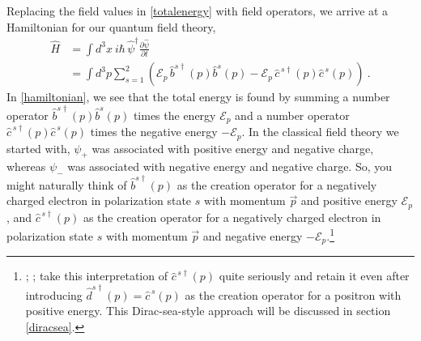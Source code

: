 \documentclass[12pt,secnumarabic,amsmath,amssymb,balancelastpage,nofootinbib]{article}
\begin{document}
Replacing the field values in \eqref{totalenergy} with field operators, we arrive at a Hamiltonian for our quantum field theory,
\begin{align}
\widehat{H}&=\int{d^3 x \ i \hbar \, \widehat{\psi}^\dagger\frac{\partial \widehat{\psi}}{\partial t}}
\nonumber
\\
&=\int{d^3 p \sum_{s=1}^2  \left(\mathcal{E}_p\,\widehat{b}^{s\dagger}(p)\widehat{b}^s(p)-\mathcal{E}_p\,\widehat{c}^{\,s\dagger}(p)\widehat{c}^{\,s}(p)\right)}
\ .
\label{hamiltonian}
\end{align}
In \eqref{hamiltonian}, we see that the total energy is found by summing a number operator $\widehat{b}^{s\dagger}(p)\widehat{b}^s(p)$ times the energy $\mathcal{E}_p$ and a number operator $\widehat{c}^{\,s\dagger}(p)\widehat{c}^{\,s}(p)$ times the negative energy $-\mathcal{E}_p$.  In the classical field theory we started with, $\psi_+$ was associated with positive energy and negative charge, whereas $\psi_-$ was associated with negative energy and negative charge.  So, you might naturally think of $\widehat{b}^{s\dagger}(p)$ as the creation operator for a negatively charged electron in polarization state $s$ with momentum $\vec{p}$ and positive energy $\mathcal{E}_p$, and $\widehat{c}^{\,s\dagger}(p)$ as the creation operator for a negatively charged electron in polarization state $s$ with momentum $\vec{p}$ and negative energy $-\mathcal{E}_p$.\footnote{\citet[sec.\ 8a]{schweberQFT}; \citet[sec.\ 13.4]{bjorkendrellfields}; \citet{hatfield} take this interpretation of $\widehat{c}^{\,s\dagger}(p)$ quite seriously and retain it even after introducing $\widehat{d}^{s\dagger}(p)=\widehat{c}^{\,s}(p)$ as the creation operator for a positron with positive energy.  This Dirac-sea-style approach will be discussed in section \ref{diracsea}.}
\end{document}
